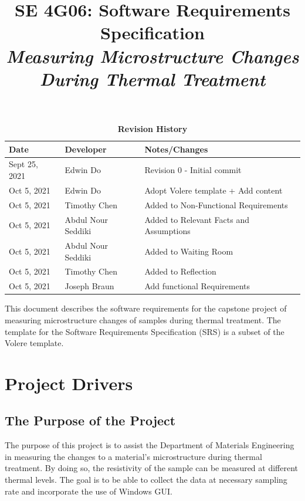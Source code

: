 \documentclass[12pt, titlepage]{article}
\title{SE 4G06: Software Requirements Specification\\\textit{Measuring Microstructure Changes During Thermal Treatment }}
\author{\authname}
\date{}
\begin{document}
\maketitle

\tableofcontents
\listoftables
\listoffigures

\begin{table}[H]
\caption{\bf Revision History}
\begin{tabularx}{\textwidth}{p{2.5cm}p{2.5cm}X}
\toprule {\bf Date} & {\bf Developer} & {\bf Notes/Changes}\\
\midrule
Sept 25, 2021 & Edwin Do & Revision 0 - Initial commit\\
Oct 5, 2021 & Edwin Do & Adopt Volere template + Add content \\
Oct 5, 2021 & Timothy Chen & Added to Non-Functional Requirements\\
Oct 5, 2021 & Abdul Nour Seddiki & Added to Relevant Facts and Assumptions\\
Oct 5, 2021 & Abdul Nour Seddiki & Added to Waiting Room\\
Oct 5, 2021 & Timothy Chen & Added to Reflection\\
Oct 5, 2021 & Joseph Braun & Add functional Requirements \\ 

\bottomrule
\end{tabularx}
\end{table}

\newpage


This document describes the software requirements for the capstone project of measuring microstructure changes of samples during thermal treatment. The template for the Software Requirements Specification (SRS) is a subset of the Volere
template.


\section{Project Drivers}

\subsection{The Purpose of the Project}
The purpose of this project is to assist the Department of Materials Engineering in measuring the changes to a material's microstructure during thermal treatment. 
By doing so, the resistivity of the sample can be measured at different thermal levels. The goal is to be able to collect the data at necessary sampling rate and 
incorporate the use of Windows GUI. 
\end{document}
